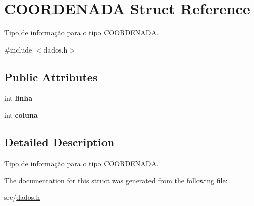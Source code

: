 \hypertarget{structCOORDENADA}{}\section{C\+O\+O\+R\+D\+E\+N\+A\+DA Struct Reference}
\label{structCOORDENADA}


Tipo de informação para o tipo \hyperlink{structCOORDENADA}{C\+O\+O\+R\+D\+E\+N\+A\+DA}.  




{\ttfamily \#include $<$dados.\+h$>$}

\subsection*{Public Attributes}
\begin{DoxyCompactItemize}
\item 
\mbox{\label{structCOORDENADA_aefe14bcc5a066ac3b21500cc3d28c06f}} 
int {\bfseries linha}
\item 
\mbox{\label{structCOORDENADA_adfbc8d4856ce807139fdf62e00aed29a}} 
int {\bfseries coluna}
\end{DoxyCompactItemize}


\subsection{Detailed Description}
Tipo de informação para o tipo \hyperlink{structCOORDENADA}{C\+O\+O\+R\+D\+E\+N\+A\+DA}. 

The documentation for this struct was generated from the following file\+:\begin{DoxyCompactItemize}
\item 
src/\hyperlink{dados_8h}{dados.\+h}\end{DoxyCompactItemize}
